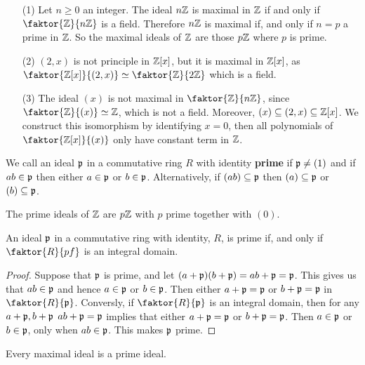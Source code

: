 \begin{example}\label{1.15}
    \begin{enumerate}
        \item[(1)] Let $n \geq 0$ an integer. The ideal  $n\mathbb{Z}$ is maximal in
            $\mathbb{Z}$ if and only if  $\faktor{\Z}{n\Z}$ is a field. Therefore $n\mathbb{Z}$
            is maximal if, and only if  $n=p$ a prime in $\mathbb{Z}$. So the maximal
            ideals of $\mathbb{Z}$ are those  $p\mathbb{Z}$ where  $p$ is prime.

        \item[(2)] $(2,x)$ is not principle in $\mathbb{Z}[x]$, but it is maximal in
            $\mathbb{Z}[x]$, as $\faktor{\Z[x]}{(2,x)} \simeq \faktor{\Z}{2\Z}$ which
            is a field.

        \item[(3)] The ideal $(x)$ is not maximal in $\faktor{\Z}{n\Z}$, since
            $\faktor{\Z}{(x)} \simeq \Z$, which is not a field. Moreover, $(x)
            \subseteq (2,x) \subseteq \mathbb{Z}[x]$. We construct this isomorphism by
            identifying $x=0$, then all polynomials of $\faktor{\Z[x]}{(x)}$ only
            have constant term in $\mathbb{Z}$.
    \end{enumerate}
\end{example}

\begin{definition}
    We call an ideal $\mathfrak{p}$ in a commutative ring  $R$ with identity
    \textbf{prime} if $\mathfrak{p} \neq (1)$ and if $ab \in \mathfrak{p}$ then either $a \in \mathfrak{p}$
    or $b \in \mathfrak{p}$. Alternatively, if $(ab) \subseteq \mathfrak{p}$ then $(a) \subseteq
    \mathfrak{p}$ or $(b) \subseteq \mathfrak{p}$.
\end{definition}

\begin{example}\label{1.16}
    The prime ideals of $\mathbb{Z}$ are $p\mathbb{Z}$ with  $p$ prime together with $(0)$.
\end{example}

\begin{lemma}\label{1.4.4}
    An ideal $\mathfrak{p}$ in a commutative ring with identity, $R$, is prime if, and
    only if $\faktor{R}{pf}$ is an integral domain.
\end{lemma}
\begin{proof}
    Suppose that $\mathfrak{p}$ is prime, and let  $(a+\mathfrak{p})(b+\mathfrak{p})=ab+\mathfrak{p}=\mathfrak{p}$. This
    gives us that $ab \in \mathfrak{p}$ and hence  $a \in \mathfrak{p}$ or  $b \in \mathfrak{p}$. Then
    either $a+\mathfrak{p}=\mathfrak{p}$ or $b+\mathfrak{p}=\mathfrak{p}$ in $\faktor{R}{\pf}$. Conversly, if
    $\faktor{R}{\pf}$ is an integral domain, then for any $a+\mathfrak{p},b+\mathfrak{p}$
    $ab+\mathfrak{p}=\mathfrak{p}$ implies that either $a+\mathfrak{p}=\mathfrak{p}$ or  $b+\mathfrak{p}=\mathfrak{p}$. Then
     $a \in \mathfrak{p}$ or  $b \in \mathfrak{p}$, only when  $ab \in \mathfrak{p}$. This makes $\mathfrak{p}$ prime.
\end{proof}
\begin{corollary}
    Every maximal ideal is a prime ideal.
\end{corollary}

